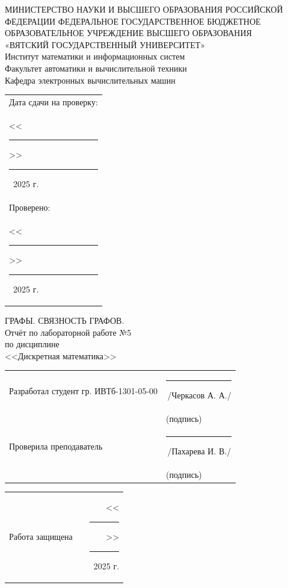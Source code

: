 \documentclass[oneside,a4paper,14pt]{extarticle}
\begin{document}
\newpage
\thispagestyle{empty}
\begin{center}
	МИНИСТЕРСТВО НАУКИ И ВЫСШЕГО ОБРАЗОВАНИЯ РОССИЙСКОЙ ФЕДЕРАЦИИ ФЕДЕРАЛЬНОЕ ГОСУДАРСТВЕННОЕ БЮДЖЕТНОЕ ОБРАЗОВАТЕЛЬНОЕ УЧРЕЖДЕНИЕ ВЫСШЕГО ОБРАЗОВАНИЯ\\
	«ВЯТСКИЙ ГОСУДАРСТВЕННЫЙ УНИВЕРСИТЕТ»\\
	Институт математики и информационных систем\\
	Факультет автоматики и вычислительной техники\\
	Кафедра электронных вычислительных машин
\end{center}
\vspace{10mm}

\hfill
\begin{tabular}{l}
  \footnotesize Дата сдачи на проверку: \\
  \footnotesize <<\rule[-1mm]{5mm}{0.10mm}\/>>\rule[-1mm]{20mm}{0.10mm}\ 2025 г.\\
  \footnotesize Проверено: \\
  \footnotesize <<\rule[-1mm]{5mm}{0.10mm}\/>>\rule[-1mm]{20mm}{0.10mm}\ 2025 г. \\
\end{tabular}
\vfill

\begin{center}
  ГРАФЫ. СВЯЗНОСТЬ ГРАФОВ.\\
	Отчёт по лабораторной работе №5\\
	по дисциплине\\
	<<Дискретная математика>>\\
\end{center}
\vspace{25mm}
\noindent
\begin{tabular}{ll}
	Разработал студент гр. ИВТб-1301-05-00 & \rule[-1mm]{30mm}{0.10mm}\,/Черкасов А. А./   \\
	                                       & \hspace{8mm}\footnotesize(подпись)            \\
	Проверила преподаватель                & \rule[-1mm]{30mm}{0.10mm}\,/Пахарева И. В./ \\
	                                       & \hspace{8mm}\footnotesize(подпись)            \\
\end{tabular}

\noindent
  \begin{tabular}{lp{58mm}r}
    Работа защищена &  & <<\rule[-1mm]{5mm}{0.10mm}\/>>\rule[-1mm]{30mm}{0.10mm}\ 2025 г.
  \end{tabular}
  \vfill
\end{document}
